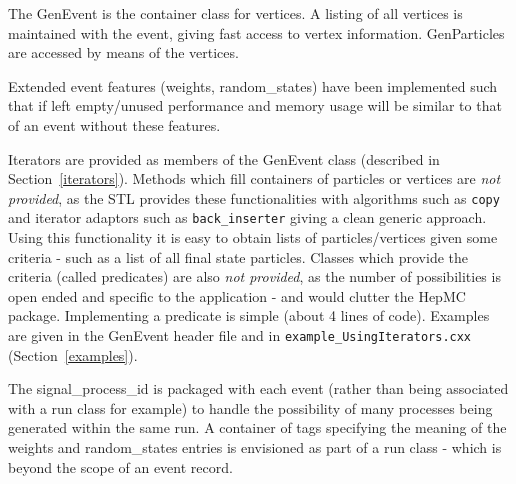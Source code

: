 \documentclass[11pt,letterpaper]{article}
\begin{document}
The GenEvent is the container class for vertices. 
A listing of all vertices is maintained with the event, giving fast
access to vertex information. GenParticles are accessed by means of the
vertices.

Extended event features (weights, random\_states) have been
implemented such that if left empty/unused performance and memory
usage will be similar to that of an event without these features.

Iterators are provided as members of the GenEvent class
(described in Section~\ref{iterators}). Methods which fill containers of
particles or vertices are {\it not provided}, as the STL provides these
functionalities with algorithms such as \verb!copy! and iterator adaptors
such as \verb!back_inserter! giving a clean generic approach.
Using this functionality it is easy to obtain lists of
particles/vertices given some criteria - such as a list of all final
state particles. Classes which provide the criteria (called
predicates) are also {\it not provided}, as the number of
possibilities is open ended and specific to the application -
and would clutter the HepMC package. Implementing a predicate is
simple (about 4 lines of code).
Examples are given in the GenEvent header file and in
\verb!example_UsingIterators.cxx! (Section~\ref{examples}).

The signal\_process\_id is packaged with each event (rather than being
associated with a run class for example) to handle the possibility of
many processes being generated within the same run. A container of
tags specifying the meaning of the weights and random\_states entries
is envisioned as part of a run class - which is beyond the scope of an
event record.
%
%
\end{document}

